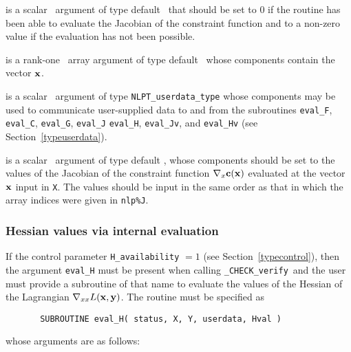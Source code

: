 \documentclass{galahad}
\newcommand{\packagename}{CHECK}
\newcommand{\fullpackagename}{\libraryname\_\packagename}
\newcommand{\solver}{{\tt \fullpackagename\_verify}}
\begin{document}
\begin{description}
 is a scalar \intentout\ argument of type default \integer\
that should be set to 0 if the routine has been able to evaluate
the Jacobian of the constraint function
and to a non-zero value if the evaluation has not been possible.

 is a rank-one \intentin\ array argument of type default \realdp\
whose components contain the vector ${\mathbf{x}}$.

 is a scalar \intentinout\ argument of type 
{\tt NLPT\_userdata\_type} whose components may be used
to communicate user-supplied data to and from the
subroutines {\tt eval\_F}, {\tt eval\_C}, {\tt eval\_G}, {\tt eval\_J}
{\tt eval\_H}, {\tt eval\_Jv}, and {\tt eval\_Hv} 
(see Section~\ref{typeuserdata}).

 is a scalar \intentout\ argument of type default \realdp,
whose components should be set to the values of the Jacobian
of the constraint function $\nabla_x {\mathbf{c}}({\mathbf{x}})$
evaluated at the vector ${\mathbf{x}}$ input in {\tt X}. The values should
be input in the same order as that in which the array indices were
given in {\tt nlp\%J}.

\end{description}


\subsubsection{Hessian values via internal evaluation\label{hfv}}

If the control parameter {\tt H\_availability} $=1$ (see
Section~\ref{typecontrol}), then the argument {\tt eval\_H} must be
present when calling \solver\ and the
user must provide a subroutine of that name to evaluate the
values of the Hessian of the Lagrangian $\nabla_{xx} L({\mathbf{x}},{\mathbf{y}})$.
The routine must be specified as

\def\baselinestretch{0.8}
{\tt \begin{verbatim}
       SUBROUTINE eval_H( status, X, Y, userdata, Hval ) \end{verbatim} }
\def\baselinestretch{1.0}
\noindent whose arguments are as follows:
\end{document}
